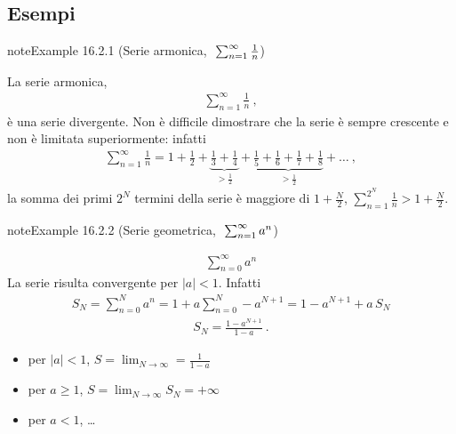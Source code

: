 \documentclass[letterpaper,10pt,italian]{jupyterBook}
\begin{document}
\subsection{Esempi}
\label{\detokenize{ch/series/series-numerical-real:esempi}}\label{ch/series/series-numerical-real:series-harmonic}
\begin{sphinxadmonition}{note}{Example 16.2.1 (Serie armonica, \protect\(\ \sum_{n=1}^{\infty} \frac{1}{n}\protect\))}



\sphinxAtStartPar
La serie armonica,
\begin{equation*}
\begin{split}\sum_{n=1}^{\infty} \frac{1}{n} \ ,\end{split}
\end{equation*}
\sphinxAtStartPar
è una serie divergente. Non è difficile dimostrare che la serie è sempre crescente e non è limitata superiormente: infatti
\begin{equation*}
\begin{split}\sum_{n=1}^{\infty} \frac{1}{n} = 1 + \frac{1}{2} + \underbrace{\frac{1}{3} + \frac{1}{4}}_{> \frac{1}{2}} + \underbrace{\frac{1}{5} + \frac{1}{6} + \frac{1}{7} + \frac{1}{8}}_{> \frac{1}{2}} + \dots \ ,\end{split}
\end{equation*}
\sphinxAtStartPar
la somma dei primi \(2^N\) termini della serie è maggiore di \(1 + \frac{N}{2}\), \(\sum_{n=1}^{2^N} \frac{1}{n} > 1 + \frac{N}{2}\).
\end{sphinxadmonition}
\label{ch/series/series-numerical-real:series-geometric}
\begin{sphinxadmonition}{note}{Example 16.2.2 (Serie geometrica, \protect\(\ \sum_{n=1}^{\infty} a^n\protect\))}


\begin{equation*}
\begin{split}\sum_{n=0}^{\infty} a^n\end{split}
\end{equation*}
\sphinxAtStartPar
La serie risulta convergente per \(|a|<1\). Infatti
\begin{equation*}
\begin{split}S_N = \sum_{n=0}^{N} a^n = 1 + a \sum_{n=0}^{N} - a^{N+1} = 1 - a^{N+1} + a \, S_N\end{split}
\end{equation*}\begin{equation*}
\begin{split}S_N = \frac{1 - a^{N+1}}{1-a} \ .\end{split}
\end{equation*}\begin{itemize}
\item {} 
\sphinxAtStartPar
per \(|a| < 1\), \(S = \lim_{N \rightarrow \infty} = \frac{1}{1 - a}\)

\item {} 
\sphinxAtStartPar
per \(a \ge 1\), \(S = \lim_{N \rightarrow \infty} S_N = +\infty\)

\item {} 
\sphinxAtStartPar
per \(a<1\), …

\end{itemize}
\end{sphinxadmonition}
\end{document}
